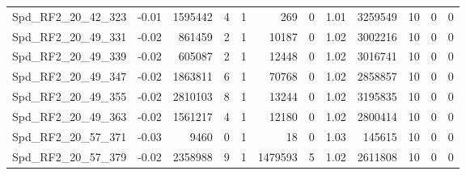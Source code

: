 \begin{longtable}[c]{@{}lrrrrrrrrrrr@{}}
Spd\_RF2\_20\_42\_323         & -0.01                  & 1595442                 & 4                       & 1                      & 269                     & 0                       & 1.01                    & 3259549                  & 10                       & 0                        & 0                        \\
Spd\_RF2\_20\_49\_331         & -0.02                  & 861459                  & 2                       & 1                      & 10187                   & 0                       & 1.02                    & 3002216                  & 10                       & 0                        & 0                        \\
Spd\_RF2\_20\_49\_339         & -0.02                  & 605087                  & 2                       & 1                      & 12448                   & 0                       & 1.02                    & 3016741                  & 10                       & 0                        & 0                        \\
Spd\_RF2\_20\_49\_347         & -0.02                  & 1863811                 & 6                       & 1                      & 70768                   & 0                       & 1.02                    & 2858857                  & 10                       & 0                        & 0                        \\
Spd\_RF2\_20\_49\_355         & -0.02                  & 2810103                 & 8                       & 1                      & 13244                   & 0                       & 1.02                    & 3195835                  & 10                       & 0                        & 0                        \\
Spd\_RF2\_20\_49\_363         & -0.02                  & 1561217                 & 4                       & 1                      & 12180                   & 0                       & 1.02                    & 2800414                  & 10                       & 0                        & 0                        \\
Spd\_RF2\_20\_57\_371         & -0.03                  & 9460                    & 0                       & 1                      & 18                      & 0                       & 1.03                    & 145615                   & 10                       & 0                        & 0                        \\
Spd\_RF2\_20\_57\_379         & -0.02                  & 2358988                 & 9                       & 1                      & 1479593                 & 5                       & 1.02                    & 2611808                  & 10                       & 0                        & 0                        \\

\end{longtable}
